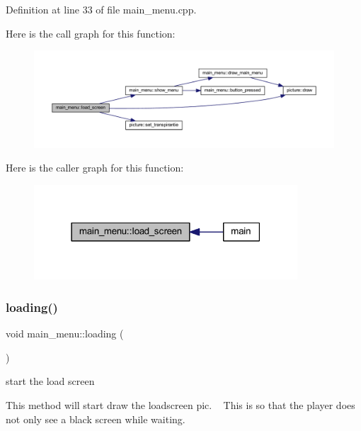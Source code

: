 Definition at line 33 of file main\+\_\+menu.\+cpp.

Here is the call graph for this function\+:
\nopagebreak
\begin{figure}[H]
\begin{center}
\leavevmode
\includegraphics[width=350pt]{classmain__menu_a924f8d3f2d87b382a8590055cda2f549_cgraph}
\end{center}
\end{figure}
Here is the caller graph for this function\+:
\nopagebreak
\begin{figure}[H]
\begin{center}
\leavevmode
\includegraphics[width=279pt]{classmain__menu_a924f8d3f2d87b382a8590055cda2f549_icgraph}
\end{center}
\end{figure}
\mbox{\label{classmain__menu_a83e10a5ce65747f1de76e40d32dd8e5b}} 
\subsubsection{\texorpdfstring{loading()}{loading()}}
{\footnotesize\ttfamily void main\+\_\+menu\+::loading (\begin{DoxyParamCaption}{ }\end{DoxyParamCaption})}



start the load screen 

This method will start draw the loadscreen pic. ~\newline
This is so that the player does not only see a black screen while waiting. ~\newline


